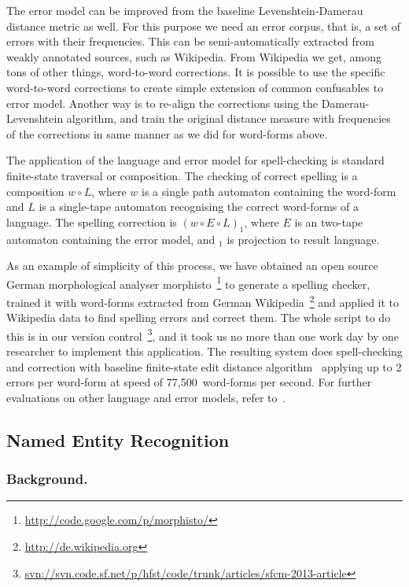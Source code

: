 \documentclass{llncs}
\begin{document}
The error model can be improved from the baseline Levenshtein-Damerau distance
metric as well. For this purpose we need an error corpus, that is, a set of
errors with their frequencies. This can be semi-automatically extracted from
weakly annotated sources, such as Wikipedia. From Wikipedia we get, among tons
of other things, word-to-word corrections. It is possible to use the specific
word-to-word corrections to create simple extension of common confusables to
error model. Another way is to re-align the corrections using the
Damerau-Levenshtein algorithm, and train the original distance measure with
frequencies of the corrections in same manner as we did for word-forms above.

The application of the language and error model for spell-checking is
standard finite-state traversal or composition. The checking of correct spelling
is a composition $w \circ L$, where $w$ is a single path automaton containing
the word-form and $L$ is a single-tape automaton recognising the correct
word-forms of a language. The spelling correction is $(w \circ E \circ L)_1$,
where $E$ is an two-tape automaton containing the error model, and $_1$ is
projection to result language.

As an example of simplicity of this process, we have obtained an open source
German morphological analyser
morphisto~\footnote{\url{http://code.google.com/p/morphisto/}} to generate a
spelling checker, trained it with word-forms extracted from German
Wikipedia~\footnote{\url{http://de.wikipedia.org}} and applied it to Wikipedia
data to find spelling errors and correct them. The whole script to do this is
in our version
control~\footnote{\url{svn://svn.code.sf.net/p/hfst/code/trunk/articles/sfcm-2013-article}},
and it took us no more than one work day by one researcher to implement this
application.  The resulting system does spell-checking and correction with
baseline finite-state edit distance algorithm~\cite{pirinen2010finitestate}
applying up to 2 errors per word-form at speed of 77,500~word-forms per second.
For further evaluations on other language and error models, refer
to~\cite{pirinen2012improving}.

\subsection{Named Entity Recognition}

\subsubsection{Background.}
\end{document}
